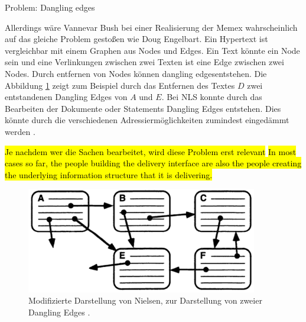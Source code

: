 \begin{section}{Problem: Dangling edges}
\label{sec:dangling}

Allerdings wäre Vannevar Bush bei einer Realisierung der Memex wahrscheinlich auf das gleiche Problem gestoßen wie Doug Engelbart. Ein Hypertext ist vergleichbar mit einem Graphen aus Nodes und Edges. Ein Text könnte ein Node sein und eine Verlinkungen zwischen zwei Texten ist eine Edge zwischen zwei Nodes. Durch entfernen von Nodes können \glqq dangling edges\grqq{ }entstehen. Die Abbildung \ref{fig:dangle} zeigt zum Beispiel durch das Entfernen des Textes $D$ zwei entstandenen Dangling Edges von $A$ und $E$. Bei NLS konnte durch das Bearbeiten der Dokumente oder Statements Dangling Edges entstehen. Dies könnte durch die verschiedenen Adressiermöglichkeiten zumindest eingedämmt werden \cite{Engelbart1984}.

\hl{Je nachdem wer die Sachen bearbeitet, wird diese Problem erst relevant}
\hl{In most cases so far, the people building the delivery interface are also the people creating the underlying information structure that it is delivering.}

\begin{figure}[!ht]
	\centering
	\includegraphics[width=0.9\textwidth]{image/dangle}
	\caption{Modifizierte Darstellung von Nielsen, zur Darstellung von zweier Dangling Edges \cite[S.1]{Nielsen1995}.}
	\label{fig:dangle}
\end{figure}

\end{section}

